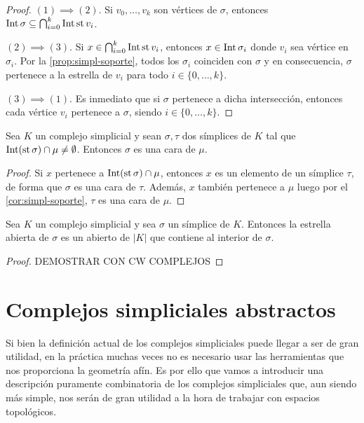 \begin{proof}
	$(1) \implies (2)$. Si $v_{0}, \dots, v_{k}$ son vértices de $\sigma$, entonces
	$\operatorname{Int} \sigma \subseteq \bigcap_{i=0}^{k} \operatorname{Int} \operatorname{st} v_{i}$.
	
	$(2) \implies (3)$. Si $x \in \bigcap_{i=0}^{k} \operatorname{Int} \operatorname{st} v_{i}$, entonces
	$x \in \operatorname{Int} \sigma_{i}$ donde $v_{i}$ sea vértice en $\sigma_{i}$. Por la
	\autoref{prop:simpl-soporte}, todos los $\sigma_{i}$ coinciden con $\sigma$ y en
	consecuencia, $\sigma$ pertenece a la estrella de $v_{i}$ para todo
	$i \in \{0, \dots, k\}$.
	
	$(3) \implies (1)$. Es inmediato que si $\sigma$ pertenece a dicha intersección,
	entonces cada vértice $v_{i}$ pertenece a $\sigma$, siendo $i \in \{0, \dots, k
	\}$.
\end{proof}
\begin{lema}
	Sea $K$ un complejo simplicial y sean $\sigma, \tau$ dos símplices de $K$ tal que
	$\operatorname{Int}(\operatorname{st}\sigma) \cap \mu \neq \emptyset$. Entonces $\sigma$ es una cara
	de $\mu$.
\end{lema}
\begin{proof}
	Si $x$ pertenece a $\operatorname{Int} (\operatorname{st} \sigma) \cap \mu$, entonces $x$ es un
	elemento de un símplice $\tau$, de forma que $\sigma$ es una cara de $\tau$.
	Además, $x$ también pertenece a $\mu$ luego por el \autoref{cor:simpl-soporte},
	$\tau$ es una cara de $\mu$.
\end{proof}
\begin{proposicion}
	\label{prop:estr-abierta-abierto-en-K} Sea $K$ un complejo simplicial y sea $\sigma$
	un símplice de $K$. Entonces la estrella abierta de $\sigma$ es un abierto de
	$|K|$ que contiene al interior de $\sigma$.
\end{proposicion}
\begin{proof}
	DEMOSTRAR CON CW COMPLEJOS
\end{proof}

\section{Complejos simpliciales abstractos}

Si bien la definición actual de los complejos simpliciales puede llegar a ser de
gran utilidad, en la práctica muchas veces no es necesario usar las herramientas
que nos proporciona la geometría afín. Es por ello que vamos a introducir una descripción
puramente combinatoria de los complejos simpliciales que, aun siendo más simple,
nos serán de gran utilidad a la hora de trabajar con espacios topológicos.

